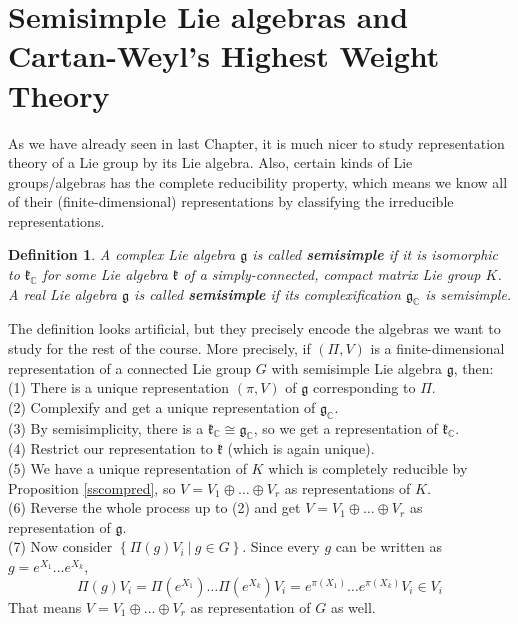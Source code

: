 \documentclass[11pt]{article}
\newtheorem{definition}[theorem]{Definition}
\newcommand{\bb}[1]{\mathbb{#1}}
\newcommand{\mf}[1]{\mathfrak{#1}}
\begin{document}
\section{Semisimple Lie algebras and Cartan-Weyl's Highest Weight Theory}
As we have already seen in last Chapter, it is much nicer to study representation theory of a Lie group by its Lie algebra. Also, certain kinds of Lie groups/algebras has the complete reducibility property, which means we know all of their (finite-dimensional) representations by classifying the irreducible representations.
\begin{definition}
A complex Lie algebra $\mf{g}$ is called \textbf{semisimple} if it is isomorphic to $\mf{k}_{\bb{C}}$ for some Lie algebra $\mf{k}$ of a simply-connected, compact matrix Lie group $K$.\\
A real Lie algebra $\mf{g}$ is called \textbf{semisimple} if its complexification $\mf{g}_{\bb{C}}$ is semisimple.
\end{definition}
The definition looks artificial, but they precisely encode the algebras we want to study for the rest of the course. More precisely, if $(\Pi,V)$ is a finite-dimensional representation of a connected Lie group $G$ with semisimple Lie algebra $\mf{g}$, then:\\

\noindent (1) There is a unique representation $(\pi,V)$ of $\mf{g}$ corresponding to $\Pi$.\\
(2) Complexify and get a unique representation of $\mf{g}_{\bb{C}}$.\\
(3) By semisimplicity, there is a $\mf{k}_{\bb{C}} \cong \mf{g}_{\bb{C}}$, so we get a representation of $\mf{k}_{\bb{C}}$.\\
(4) Restrict our representation to $\mf{k}$ (which is again unique).\\
(5) We have a unique representation of $K$ which is completely reducible by Proposition \ref{sscompred}, so $V = V_1 \oplus \dots \oplus V_r$ as representations of $K$.\\
(6) Reverse the whole process up to (2) and get $V = V_1 \oplus \dots \oplus V_r$ as representation of $\mf{g}$.\\
(7) Now consider $\left\{ \Pi(g)V_i\ \Big|\ g \in G\right\}$. Since every $g$ can be written as $g = e^{X_1} \dots e^{X_k}$,
$$\Pi(g)V_i = \Pi(e^{X_1}) \dots \Pi(e^{X_k})V_i = e^{\pi(X_1)}\dots e^{\pi(X_k)} V_i \in V_i$$
That means $V = V_1 \oplus \dots \oplus V_r$ as representation of $G$ as well.\\
\end{document}
